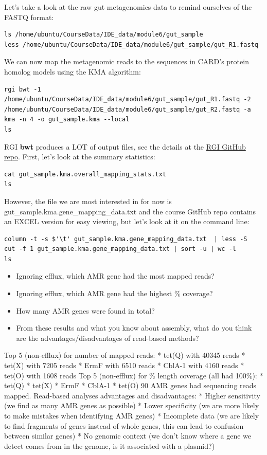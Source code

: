 \documentclass[
]{book}
\providecommand{\tightlist}{%
  \setlength{\itemsep}{0pt}\setlength{\parskip}{0pt}}
\begin{document}
Let's take a look at the raw gut metagenomics data to remind ourselves of the FASTQ format:

\begin{verbatim}
ls /home/ubuntu/CourseData/IDE_data/module6/gut_sample
less /home/ubuntu/CourseData/IDE_data/module6/gut_sample/gut_R1.fastq
\end{verbatim}

We can now map the metagenomic reads to the sequences in CARD's protein homolog models using the KMA algorithm:

\begin{verbatim}
rgi bwt -1 /home/ubuntu/CourseData/IDE_data/module6/gut_sample/gut_R1.fastq -2 /home/ubuntu/CourseData/IDE_data/module6/gut_sample/gut_R2.fastq -a kma -n 4 -o gut_sample.kma --local
ls
\end{verbatim}

RGI \textbf{bwt} produces a LOT of output files, see the details at the \href{https://github.com/arpcard/rgi\#rgi-bwt-tab-delimited-output-details}{RGI GitHub repo}. First, let's look at the summary statistics:

\begin{verbatim}
cat gut_sample.kma.overall_mapping_stats.txt
ls
\end{verbatim}

However, the file we are most interested in for now is gut\_sample.kma.gene\_mapping\_data.txt and the course GitHub repo contains an EXCEL version for easy viewing, but let's look at it on the command line:

\begin{verbatim}
column -t -s $'\t' gut_sample.kma.gene_mapping_data.txt  | less -S
cut -f 1 gut_sample.kma.gene_mapping_data.txt | sort -u | wc -l
ls
\end{verbatim}

\begin{itemize}
\tightlist
\item
  Ignoring efflux, which AMR gene had the most mapped reads?
\item
  Ignoring efflux, which AMR gene had the highest \% coverage?
\item
  How many AMR genes were found in total?
\item
  From these results and what you know about assembly, what do you think are the advantages/disadvantages of read-based methods?
\end{itemize}

Top 5 (non-efflux) for number of mapped reads: * tet(Q) with 40345 reads * tet(X) with 7205 reads * ErmF with 6510 reads * CblA-1 with 4160 reads * tet(O) with 1608 reads Top 5 (non-efflux) for \% length coverage (all had 100\%): * tet(Q) * tet(X) * ErmF * CblA-1 * tet(O) 90 AMR genes had sequencing reads mapped. Read-based analyses advantages and disadvantages: * Higher sensitivity (we find as many AMR genes as possible) * Lower specificity (we are more likely to make mistakes when identifying AMR genes) * Incomplete data (we are likely to find fragments of genes instead of whole genes, this can lead to confusion between similar genes) * No genomic context (we don't know where a gene we detect comes from in the genome, is it associated with a plasmid?)
\end{document}
